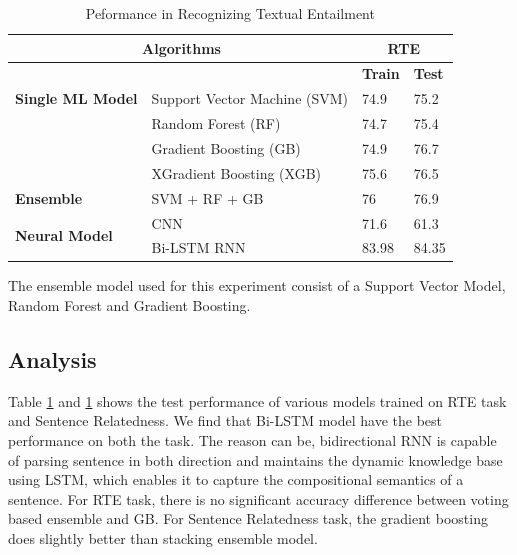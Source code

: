 \documentclass[12pt]{report} %
\begin{document}
\begin{table}[h]
	\centering
	\caption{ Peformance in Recognizing Textual Entailment}
	\label{rte-perf}
	\begin{tabular}{|l|l|l|l|}
		\hline
		\multicolumn{2}{|c|}{\textbf{Algorithms}}                                     & \multicolumn{2}{c|}{\textbf{RTE}}                   \\ \hline
		&                              & \multicolumn{1}{c|}{\textbf{Train}} & \textbf{Test} \\ \hline
		\multicolumn{1}{|c|}{\textbf{Single ML Model}} & Support Vector Machine (SVM) & 74.9                                & 75.2          \\ \cline{2-4}
		& Random Forest (RF)           & 74.7                                & 75.4          \\\cline{2-4}
		& Gradient Boosting (GB)       & 74.9                                & 76.7          \\ \cline{2-4}
		\textbf{}                                      & XGradient Boosting (XGB)     & 75.6                                & 76.5          \\ \hline
		\textbf{Ensemble}                              & SVM + RF + GB                & 76                                  & 76.9          \\ \hline
		\multirow{2}{*}{\textbf{Neural Model}}         & CNN                          & 71.6                                & 61.3          \\ \cline{2-4} 
		& Bi-LSTM RNN                  & 83.98                               & 84.35         \\ \hline
	\end{tabular}
\end{table}



The ensemble model used for this experiment consist of a Support Vector Model, Random Forest and Gradient Boosting.  


\subsection{Analysis}

Table \ref{rte-perf} and \ref{rte-perf} shows the test performance of various models trained on RTE task and Sentence Relatedness. We find that Bi-LSTM model have the best performance on both the task. The reason can be, bidirectional RNN is capable of parsing sentence in both direction and maintains the dynamic knowledge base using LSTM, which enables it to capture the compositional semantics of a sentence. For RTE task, there is no significant accuracy difference between voting based ensemble and GB. For Sentence Relatedness task, the gradient boosting does slightly better than stacking ensemble model.
\end{document}
